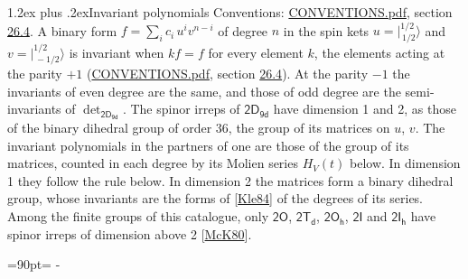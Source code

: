 \documentclass[10pt,a4paper]{article}
\makeatletter
\renewcommand\section{\@startsection{section}{1}{\z@}{-3ex plus -1ex minus -.2ex}%
  {1.2ex plus .2ex}{\normalfont\large\sffamily\bfseries\color{parttitle}}}
\newcommand{\needspace}[1]{\par\penalty-100\begingroup\dimen0=#1\relax\dimen2=\pagegoal
  \advance\dimen2-\pagetotal\ifdim\dimen0>\dimen2\relax\ifdim\dimen2>0pt\vfil\break\fi\fi
  \endgroup}
\numberwithin{equation}{section}
\newcommand{\grp}[1]{\mathsf{#1}}
\newcommand{\jm}[2]{\bigl\lvert{}^{#1}_{\,#2}\bigr\rangle}
\makeatother
\begin{document}
\section{Invariant polynomials}\label{s:invariants}
Conventions: \href{../../CONVENTIONS.pdf}{CONVENTIONS.pdf}, section \href{../../CONVENTIONS.pdf\#conv.26.4}{26.4}.
\leavevmode\label{n:local.binary.form}A binary form $f = \sum_i c_i\, u^i v^{n-i}$ of degree $n$ in the spin kets $u = \jm{1/2}{1/2}$ and $v = \jm{1/2}{-1/2}$ is invariant when $k f = f$ for every element $k$, the elements acting at the parity $+1$ (\href{../../CONVENTIONS.pdf}{CONVENTIONS.pdf}, section \href{../../CONVENTIONS.pdf\#conv.26.4}{26.4}). At the parity $-1$ the invariants of even degree are the same, and those of odd degree are the semi-invariants of $\det_{\grp{2D_{9d}}}$.
The spinor irreps of $\grp{2D_{9d}}$ have dimension 1 and 2, as those of the binary dihedral group of order 36, the group of its matrices on $u$, $v$. \label{n:function.hilbert}The invariant polynomials in the partners of one are those of the group of its matrices, counted in each degree by its Molien series $H_V(t)$ below. In dimension 1 they follow the rule below. In dimension 2 the matrices form a binary dihedral group, whose invariants are the forms of [\href{../../../REFERENCES.pdf\#ref.Kle84}{Kle84}] of the degrees of its series. Among the finite groups of this catalogue, only $\grp{2O}$, $\grp{2T_{d}}$, $\grp{2O_{h}}$, $\grp{2I}$ and $\grp{2I_{h}}$ have spinor irreps of dimension above 2 [\href{../../../REFERENCES.pdf\#ref.McK80}{McK80}].
\needspace{90pt}
\end{document}

